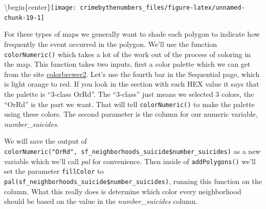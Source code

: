 \documentclass[
  12pt,
]{book}
\newenvironment{Shaded}{\begin{snugshade}}{\end{snugshade}}
\newcommand{\DataTypeTok}[1]{\textcolor[rgb]{0.27,0.27,0.27}{#1}}
\newcommand{\DecValTok}[1]{\textcolor[rgb]{0.06,0.06,0.06}{#1}}
\newcommand{\KeywordTok}[1]{\textcolor[rgb]{0.27,0.27,0.27}{\textbf{#1}}}
\newcommand{\NormalTok}[1]{#1}
\newcommand{\OperatorTok}[1]{\textcolor[rgb]{0.43,0.43,0.43}{\textbf{#1}}}
\newcommand{\StringTok}[1]{\textcolor[rgb]{0.5,0.5,0.5}{#1}}
\begin{document}
\textbackslash begin\{center\}\texttt{[image: crimebythenumbers\_files/figure-latex/unnamed-chunk-19-1]}

For these types of maps we generally want to shade each polygon to indicate how frequently the event occurred in the polygon. We'll use the function \texttt{colorNumeric()} which takes a lot of the work out of the process of coloring in the map. This function takes two inputs, first a color palette which we can get from the site \href{http://colorbrewer2.org/\#type=sequential\&scheme=OrRd\&n=3}{colorbrewer2}. Let's use the fourth bar in the Sequential page, which is light orange to red. If you look in the section with each HEX value it says that the palette is ``3-class OrRd''. The ``3-class'' just means we selected 3 colors, the ``OrRd'' is the part we want. That will tell \texttt{colorNumeric()} to make the palette using these colors. The second parameter is the column for our numeric variable, \emph{number\_suicides}.

We will save the output of \texttt{colorNumeric("OrRd",\ sf\_neighborhoods\_suicide\$number\_suicides)} as a new variable which we'll call \emph{pal} for convenience. Then inside of \texttt{addPolygons()} we'll set the parameter \texttt{fillColor} to \texttt{pal(sf\_neighborhoods\_suicide\$number\_suicides)}, running this function on the column. What this really does is determine which color every neighborhood should be based on the value in the \emph{number\_suicides} column.

\begin{Shaded}
\end{Shaded}
\end{document}

